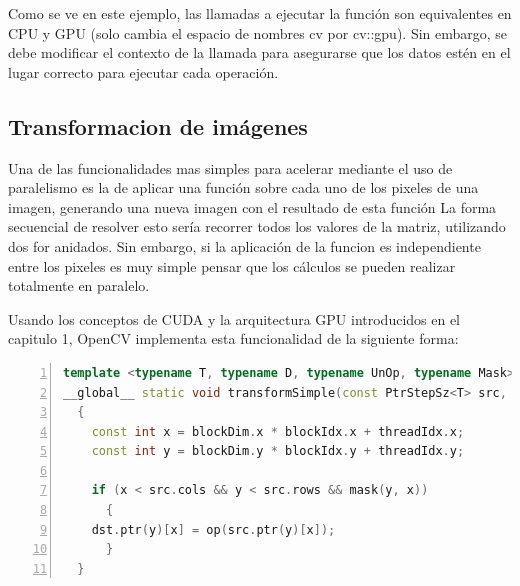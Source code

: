 \documentclass[a4paper,10pt]{report}
\begin{document}
Como se ve en este ejemplo, las llamadas a ejecutar la función son equivalentes en CPU y GPU (solo cambia el espacio de nombres cv por cv::gpu). 
Sin embargo, se debe modificar el contexto de la llamada para asegurarse que los datos estén en el lugar correcto para ejecutar cada operación.









\subsection{Transformacion de imágenes}


Una de las funcionalidades mas simples para acelerar mediante el uso de paralelismo es la de aplicar una función sobre cada uno de los pixeles de una imagen, generando una nueva imagen con el resultado de esta función
La forma secuencial de resolver esto sería recorrer todos los valores de la matriz, utilizando dos for anidados. 
Sin embargo, si la aplicación de la funcion es independiente entre los pixeles es muy simple pensar que los cálculos se pueden realizar totalmente en paralelo.

Usando los conceptos de CUDA y la arquitectura GPU introducidos en el capitulo 1, OpenCV implementa esta funcionalidad de la siguiente forma:



\begin{lstlisting}[frame=bt,caption={gpu/include/opencv2/gpu/device/detail/transform\_detail.hpp},
columns=fullflexible,numbers=left,backgroundcolor=\color{LemonChiffon1},basicstyle=\footnotesize,keywordstyle=\ttfamily\footnotesize,language=C++,stringstyle=\ttfamily,breaklines=true,xleftmargin=0.5em,xrightmargin=0pt,aboveskip=\bigskipamount,belowskip=\bigskipamount]
template <typename T, typename D, typename UnOp, typename Mask>
__global__ static void transformSimple(const PtrStepSz<T> src, PtrStep<D> dst, const Mask mask, const UnOp op)
  {
    const int x = blockDim.x * blockIdx.x + threadIdx.x;
    const int y = blockDim.y * blockIdx.y + threadIdx.y;

    if (x < src.cols && y < src.rows && mask(y, x))
      {
	dst.ptr(y)[x] = op(src.ptr(y)[x]);
      }
  }

\end{lstlisting}
\end{document}
